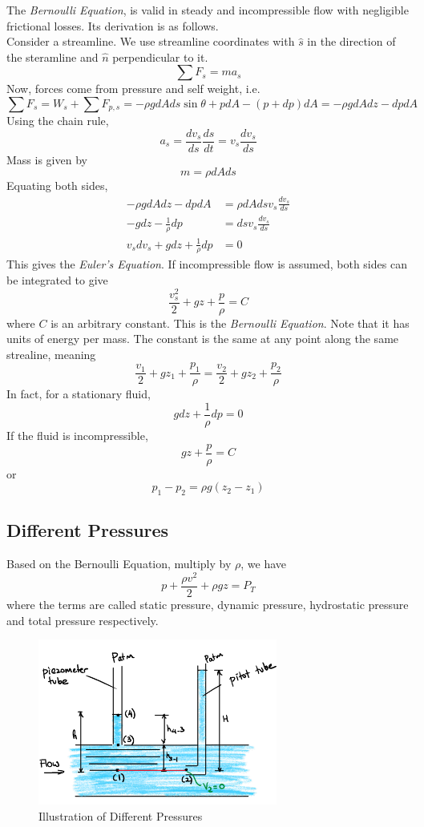 \documentclass[12pt]{article}
\begin{document}
The \emph{Bernoulli Equation}, is valid in steady and incompressible flow with negligible frictional losses. Its derivation is as follows. \\
Consider a streamline. We use streamline coordinates with $\hat{s}$ in the direction of the steramline and $\hat{n}$ perpendicular to it.
$$\sum F_s = ma_s$$
Now, forces come from pressure and self weight, i.e.
$$\sum F_s = W_s + \sum F_{p,s} = -\rho g dAds\sin\theta + pdA - (p+dp)dA = -\rho gdAdz - dpdA$$
Using the chain rule,
$$a_s = \frac{dv_s}{ds}\frac{ds}{dt} = v_s\frac{dv_s}{ds}$$
Mass is given by
$$m = \rho dAds$$
Equating both sides,
\begin{align*}
	-\rho gdAdz - dpdA &= \rho dAdsv_s\frac{dv_s}{ds} \\
	-gdz - \frac{1}{\rho}dp &= dsv_s\frac{dv_s}{ds} \\
	v_sdv_s + gdz + \frac{1}{\rho}dp &= 0
\end{align*}
This gives the \emph{Euler's Equation}. If incompressible flow is assumed, both sides can be integrated to give
$$\frac{v_s^2}{2} + gz + \frac{p}{\rho} = C$$
where $C$ is an arbitrary constant. This is the \emph{Bernoulli Equation}. Note that it has units of energy per mass. The constant is the same at any point along the same strealine, meaning
$$\frac{v_1}{2} + gz_1 + \frac{p_1}{\rho} = \frac{v_2}{2} + gz_2 + \frac{p_2}{\rho}$$
In fact, for a stationary fluid,
$$gdz + \frac{1}{\rho}dp = 0$$
If the fluid is incompressible,
$$gz + \frac{p}{\rho} = C$$
or
$$p_1-p_2 = \rho g(z_2-z_1)$$

\subsection{Different Pressures}
Based on the Bernoulli Equation, multiply by $\rho$, we have
$$p + \frac{\rho v^2}{2} + \rho gz = P_T$$
where the terms are called static pressure, dynamic pressure, hydrostatic pressure and total pressure respectively.

\begin{figure}
	\centering
	\includegraphics[width=0.7\textwidth]{tubes.png}
	\caption{Illustration of Different Pressures}
	\label{tubes}
\end{figure}
\end{document}
